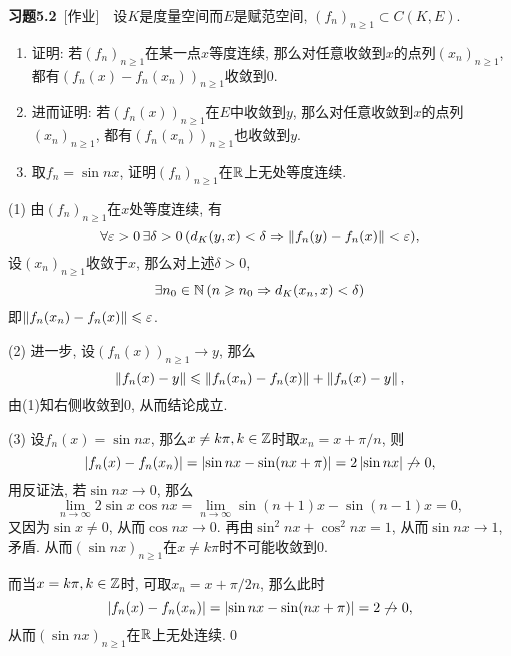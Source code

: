     \textbf{习题5.2}\ [作业]\ \ 设$ K $是度量空间而$ E $是赋范空间, $ (f_n)_{n\geqslant 1}\subset C(K,E) $.
    \begin{enumerate}[(1)]
    \item 证明: 若$ (f_n)_{n\geqslant 1} $在某一点$ x $等度连续, 那么对任意收敛到$ x $的点列$ (x_n)_{n\geqslant 1} $, 都有$ (f_n(x)-f_n(x_n))_{n\geqslant 1} $收敛到0.
    \item 进而证明: 若$ (f_n(x))_{n\geqslant 1} $在$ E $中收敛到$ y $, 那么对任意收敛到$ x $的点列$ (x_n)_{n\geqslant 1} $, 都有$ (f_n(x_n))_{n\geqslant 1} $也收敛到$ y $.
    \item 取$ f_n=\sin nx $, 证明$ (f_n)_{n\geqslant 1} $在$ \mathbb{R} $上无处等度连续.
    \end{enumerate}
    \begin{Proof}
    (1) 由$ (f_n)_{n\geqslant 1} $在$ x $处等度连续, 有
    \[
    \forall\varepsilon>0\,\exists\delta>0\,(d_K(y,x)<\delta\Rightarrow \left\| f_n(y)-f_n(x) \right\|<\varepsilon),
    \]
    设$ (x_n)_{n\geqslant 1} $收敛于$ x $, 那么对上述$ \delta>0 $,
    \[
    \exists n_0\in\mathbb{N}\,(n\geqslant n_0\Rightarrow d_K(x_n,x)<\delta)
    \]
    即$ \left\| f_n(x_n)-f_n(x) \right\|\leqslant\varepsilon $.

    (2) 进一步, 设$ (f_n(x))_{n\geqslant 1}\to y $, 那么
    \[
    \left\| f_n(x)-y \right\|\leqslant\left\| f_n(x_n)-f_n(x) \right\|+\left\| f_n(x)-y \right\|,
    \]
    由(1)知右侧收敛到0, 从而结论成立.

    (3) 设$ f_n(x)=\sin nx $, 那么$ x\ne k\pi, k\in\mathbb{Z} $时取$ x_n=x+\pi/n $, 则
    \[
    \left| f_n(x)-f_n(x_n) \right| =\left| \sin nx-\sin(nx+\pi) \right| =2\left| \sin nx \right| \not\to 0,
    \]
    用反证法, 若$ \sin nx\to 0 $, 那么
    \[
    \lim_{n\to\infty}2\sin x\cos nx=\lim_{n\to\infty}\sin(n+1)x-\sin(n-1)x=0,
    \]
    又因为$ \sin x\ne 0 $, 从而$ \cos nx\to 0 $. 再由$ \sin^2 nx+\cos^2 nx=1 $, 从而$ \sin nx\to 1 $, 矛盾. 从而$ (\sin nx)_{n\geqslant 1} $在$ x\ne k\pi $时不可能收敛到0.

    而当$ x=k\pi, k\in\mathbb{Z} $时, 可取$ x_n=x+\pi/2n $, 那么此时
    \[
    \left| f_n(x)-f_n(x_n) \right| =\left| \sin nx-\sin(nx+\pi) \right| =2\not\to 0,
    \]
    从而$ (\sin nx)_{n\geqslant 1} $在$ \mathbb{R} $上无处连续.\qed
    \end{Proof}
